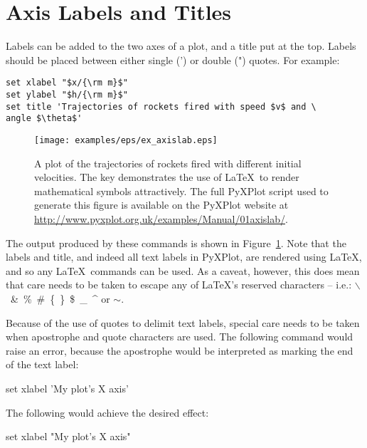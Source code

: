 \section{Axis Labels and Titles}
\label{sec:latex_incompatibility}

Labels can be added to the two axes of a plot, and a title put at the top.
Labels should be placed between either single (') or double (") quotes.  For
example:

\begin{verbatim}
set xlabel "$x/{\rm m}$"
set ylabel "$h/{\rm m}$"
set title 'Trajectories of rockets fired with speed $v$ and \
angle $\theta$'
\end{verbatim}

\begin{figure}
\begin{center}
\texttt{[image: examples/eps/ex\_axislab.eps]}
\end{center}
\caption[A plot of the trajectories of rockets fired with different initial velocities]
{A plot of the trajectories of rockets fired with different initial
velocities.  The key demonstrates the use of \LaTeX\ to render mathematical
symbols attractively.  The full PyXPlot script used to generate this figure is
available on the PyXPlot website at
\protect\url{http://www.pyxplot.org.uk/examples/Manual/01axislab/}.}
\label{fig:ex_axislab}
\end{figure}

\noindent The output produced by these commands is shown in
Figure~\ref{fig:ex_axislab}.  Note that the labels and title, and indeed all
text labels in PyXPlot, are rendered using \LaTeX, and so any \LaTeX\ commands
can be used.  As a caveat, however, this does mean that care needs to be taken
to escape any of \LaTeX's reserved characters -- i.e.:
$\backslash$~\&~\%~\#~\{~\}~\$~\_~\^{} or $\sim$.

Because of the use of quotes to delimit text labels, special care needs to be
taken when apostrophe and quote characters are used. The following command
would raise an error, because the apostrophe would be interpreted as marking
the end of the text label:

\begin{dontdo}
set xlabel 'My plot's X axis'
\end{dontdo}

\noindent The following would achieve the desired effect:

\begin{dodo}
set xlabel "My plot's X axis"
\end{dodo}

